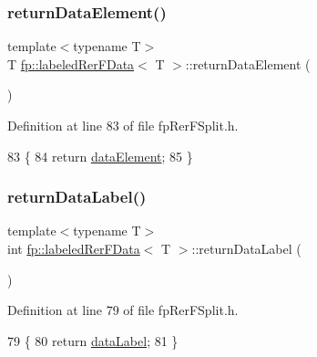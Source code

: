 \subsubsection{\texorpdfstring{return\+Data\+Element()}{returnDataElement()}}
{\footnotesize\ttfamily template$<$typename T$>$ \\
T \hyperlink{classfp_1_1labeledRerFData}{fp\+::labeled\+Rer\+F\+Data}$<$ T $>$\+::return\+Data\+Element (\begin{DoxyParamCaption}{ }\end{DoxyParamCaption})\hspace{0.3cm}{\ttfamily [inline]}}



Definition at line 83 of file fp\+Rer\+F\+Split.\+h.


\begin{DoxyCode}
83                                             \{
84                     \textcolor{keywordflow}{return} \hyperlink{classfp_1_1labeledRerFData_ace341f012e4e282c5a926ccb62246e84}{dataElement};
85                 \}
\end{DoxyCode}
\mbox{\label{classfp_1_1labeledRerFData_a00837188cd3075180409f30490a3ccaa}} 
\subsubsection{\texorpdfstring{return\+Data\+Label()}{returnDataLabel()}}
{\footnotesize\ttfamily template$<$typename T$>$ \\
int \hyperlink{classfp_1_1labeledRerFData}{fp\+::labeled\+Rer\+F\+Data}$<$ T $>$\+::return\+Data\+Label (\begin{DoxyParamCaption}{ }\end{DoxyParamCaption})\hspace{0.3cm}{\ttfamily [inline]}}



Definition at line 79 of file fp\+Rer\+F\+Split.\+h.


\begin{DoxyCode}
79                                             \{
80                     \textcolor{keywordflow}{return} \hyperlink{classfp_1_1labeledRerFData_a0129409ac4957e14ac1095c9df035b6d}{dataLabel};
81                 \}
\end{DoxyCode}
\mbox{\label{classfp_1_1labeledRerFData_a6442c552436874cc3e4ec2760153d4e7}} 
